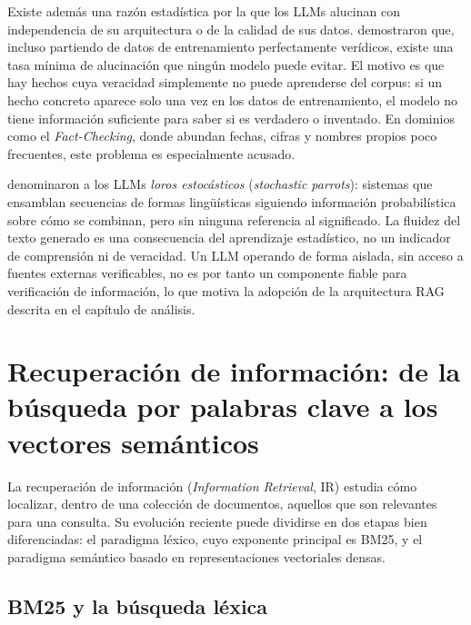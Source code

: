 Existe además una razón estadística por la que los LLMs alucinan con independencia de su arquitectura o de la calidad de sus datos. \citet{kalai2023calibrated} demostraron que, incluso partiendo de datos de entrenamiento perfectamente verídicos, existe una tasa mínima de alucinación que ningún modelo puede evitar. El motivo es que hay hechos cuya veracidad simplemente no puede aprenderse del corpus: si un hecho concreto aparece solo una vez en los datos de entrenamiento, el modelo no tiene información suficiente para saber si es verdadero o inventado. En dominios como el \textit{Fact-Checking}, donde abundan fechas, cifras y nombres propios poco frecuentes, este problema es especialmente acusado.

\citet{bender2021parrots} denominaron a los LLMs \textit{loros estocásticos} (\textit{stochastic parrots}): sistemas que ensamblan secuencias de formas lingüísticas siguiendo información probabilística sobre cómo se combinan, pero sin ninguna referencia al significado. La fluidez del texto generado es una consecuencia del aprendizaje estadístico, no un indicador de comprensión ni de veracidad. Un LLM operando de forma aislada, sin acceso a fuentes externas verificables, no es por tanto un componente fiable para verificación de información, lo que motiva la adopción de la arquitectura RAG descrita en el capítulo de análisis.

\section{Recuperación de información: de la búsqueda por palabras clave a los vectores semánticos}

La recuperación de información (\textit{Information Retrieval}, IR) estudia cómo localizar, dentro de una colección de documentos, aquellos que son relevantes para una consulta. Su evolución reciente puede dividirse en dos etapas bien diferenciadas: el paradigma léxico, cuyo exponente principal es BM25, y el paradigma semántico basado en representaciones vectoriales densas.

\subsection{BM25 y la búsqueda léxica}

